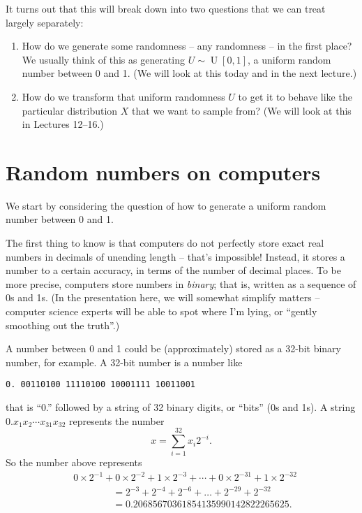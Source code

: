 \documentclass[
  letterpaper,
  DIV=11,
  numbers=noendperiod]{scrreprt}
\theoremstyle{plain}
\theoremstyle{definition}
\theoremstyle{definition}
\theoremstyle{remark}
\begin{document}
It turns out that this will break down into two questions that we can
treat largely separately:

\begin{enumerate}
\def\labelenumi{\arabic{enumi}.}
\item
  How do we generate some randomness -- any randomness -- in the first
  place? We usually think of this as generating
  \(U \sim \operatorname{U}[0,1]\), a uniform random number between 0
  and 1. (We will look at this today and in the next lecture.)
\item
  How do we transform that uniform randomness \(U\) to get it to behave
  like the particular distribution \(X\) that we want to sample from?
  (We will look at this in Lectures 12--16.)
\end{enumerate}

\section{Random numbers on computers}\label{random-numbers-on-computers}

We start by considering the question of how to generate a uniform random
number between 0 and 1.

The first thing to know is that computers do not perfectly store exact
real numbers in decimals of unending length -- that's impossible!
Instead, it stores a number to a certain accuracy, in terms of the
number of decimal places. To be more precise, computers store numbers in
\emph{binary}; that is, written as a sequence of 0s and 1s. (In the
presentation here, we will somewhat simplify matters -- computer science
experts will be able to spot where I'm lying, or ``gently smoothing out
the truth''.)

A number between 0 and 1 could be (approximately) stored as a 32-bit
binary number, for example. A 32-bit number is a number like

\begin{verbatim}
0. 00110100 11110100 10001111 10011001
\end{verbatim}

that is ``0.'' followed by a string of 32 binary digits, or ``bits'' (0s
and 1s). A string \(0.x_1x_2\cdots x_{31}x_{32}\) represents the number
\[ x = \sum_{i=1}^{32} x_i 2^{-i} . \] So the number above represents
\[ \begin{align} &0\times 2^{-1} + 0 \times 2^{-2} + 1 \times 2^{-3} + \cdots + 0 \times 2^{-31} + 1 \times 2^{-32} \\ &\qquad\qquad {}=2^{-3} + 2^{-4} + 2^{-6} + \dots + 2^{-29} + 2^{-32} \\ &\qquad\qquad {}= 0.20685670361854135990142822265625.\end{align}\]
\end{document}
